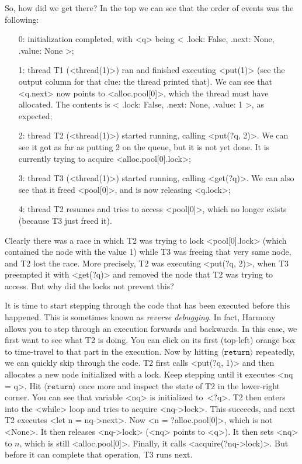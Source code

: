 \documentclass{report}
\begin{document}
So, how did we get there?  In the top we can see that the order of
events was the following:
\begin{enumerate}
\item[0:] initialization completed, with <{q}> being
<{{ .lock: False, .next: None, .value: None }}>;
\item[1:] thread T1 (<{thread(1)}>) ran and finished executing
<{put(1)}> (see the output column for that clue: the thread printed that).
We can see that <{q.next}> now points to <{alloc.pool[0]}>,
which the thread must have allocated.  The contents is 
<{{ .lock: False, .next: None, .value: 1 }}>, as expected;
\item[2:] thread T2 (<{thread(1)}>) started running, calling
<{put(?q, 2)}>.  We can see it got as far as putting 2 on the queue,
but it is not yet done.  It is currently trying to acquire
<{alloc.pool[0].lock}>;
\item[3:] thread T3 (<{thread(1)}>) started running, calling
<{get(?q)}>.  We can also see that it freed <{pool[0]}>,
and is now releasing <{q.lock}>;
\item[4:] thread T2 resumes and tries to access <{pool[0]}>, which
no longer exists (because T3 just freed it).
\end{enumerate}

Clearly there was a race in which T2 was trying to lock
<{pool[0].lock}> (which contained the node with the value 1)
while T3 was freeing that very same node, and T2 lost the race.
More precisely, T2 was executing <{put(?q, 2)}>, when T3
preempted it with <{get(?q)}> and removed the node that T2
was trying to access.  But why did the locks not prevent this?

%
It is time to start stepping through the code that has been executed
before this happened.  This is sometimes known as
\emph{reverse debugging}.  In fact, Harmony allows you to step through
an execution forwards and backwards.
In this case, we first want to see what
T2 is doing.  You can click on its first (top-left) orange box to
time-travel to that part in the execution.
Now by hitting $\langle\mathtt{return}\rangle$ repeatedly,
we can quickly skip through the code.
T2 first calls <{put(?q, 1)}> and then allocates a new
node initialized with a lock.  Keep stepping until it executes <{nq = q}>.
Hit $\langle\mathtt{return}\rangle$ once more and inspect the
state of T2 in the lower-right corner.  You can see that variable
<{nq}> is initialized to~<{?q}>.  T2 then enters into the
<{while}> loop and tries to acquire <{nq->lock}>.
This succeeds, and next T2 executes <{let n = nq->next}>.
Now <{n = ?alloc.pool[0]}>, which is not <{None}>.
It then releases <{nq->lock}>
(<{nq}> points to <{q}>).  It then sets <{nq}> to $n$, which
is still <{alloc.pool[0]}>.  Finally, it calls <{acquire(?nq->lock)}>.
But before it can complete that operation, T3 runs next.
\end{document}
